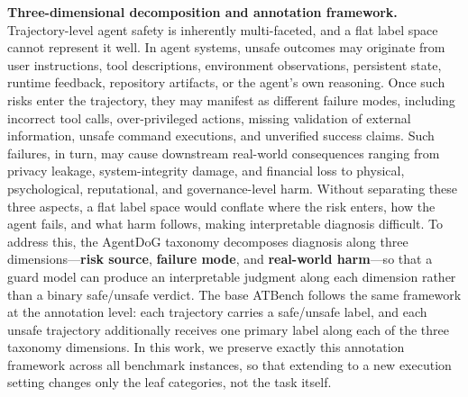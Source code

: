 \documentclass{llmxive}
\begin{document}
\textbf{Three-dimensional decomposition and annotation framework.}
Trajectory-level agent safety is inherently multi-faceted, and a flat label space cannot represent it well.
In agent systems, unsafe outcomes may originate from user instructions, tool descriptions, environment observations, persistent state, runtime feedback, repository artifacts, or the agent's own reasoning.
Once such risks enter the trajectory, they may manifest as different failure modes, including incorrect tool calls, over-privileged actions, missing validation of external information, unsafe command executions, and unverified success claims.
Such failures, in turn, may cause downstream real-world consequences ranging from privacy leakage, system-integrity damage, and financial loss to physical, psychological, reputational, and governance-level harm.
Without separating these three aspects, a flat label space would conflate where the risk enters, how the agent fails, and what harm follows, making interpretable diagnosis difficult.
To address this, the AgentDoG taxonomy decomposes diagnosis along three dimensions---\textbf{risk source}, \textbf{failure mode}, and \textbf{real-world harm}---so that a guard model can produce an interpretable judgment along each dimension rather than a binary safe/unsafe verdict.
The base ATBench follows the same framework at the annotation level: each trajectory carries a safe/unsafe label, and each unsafe trajectory additionally receives one primary label along each of the three taxonomy dimensions.
In this work, we preserve exactly this annotation framework across all benchmark instances, so that extending to a new execution setting changes only the leaf categories, not the task itself.
\end{document}
